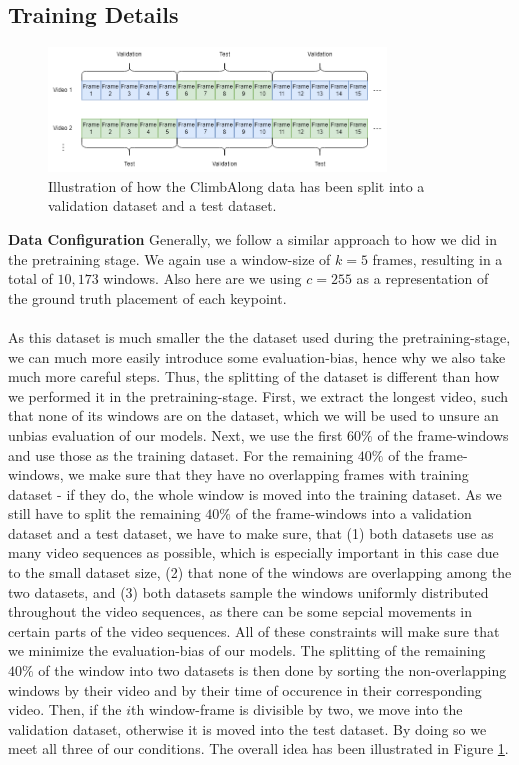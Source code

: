 \documentclass[./main.tex]{subfiles}
\begin{document}
\subsection{Training Details}
\label{sec:pretrain_details}
\begin{figure}[htbp]
    \centering
    \includegraphics[width=0.8\textwidth]{entities/CA_splitting.png}
    \caption{Illustration of how the ClimbAlong data has been split into a validation dataset and a test dataset.}
    \label{fig:CA_splitting}
\end{figure}
\noindent \textbf{Data Configuration} Generally, we follow a similar approach to how we did in the pretraining stage. We again use a window-size of $k = 5$ frames, resulting in a total of $10,173$ windows. Also here are we using $c = 255$ as a representation of the ground truth placement of each keypoint. 
\\
\\
As this dataset is much smaller the the dataset used during the pretraining-stage, we can much more easily introduce some evaluation-bias, hence why we also take much more careful steps. Thus, the splitting of the dataset is different than how we performed it in the pretraining-stage. First, we extract the longest video, such that none of its windows are on the dataset, which we will be used to unsure an unbias evaluation of our models. Next, we use the first $60\%$ of the frame-windows and use those as the training dataset. For the remaining $40\%$ of the frame-windows, we make sure that they have no overlapping frames with training dataset - if they do, the whole window is moved into the training dataset. As we still have to split the remaining $40\%$ of the frame-windows into a validation dataset and a test dataset, we have to make sure, that (1) both datasets use as many video sequences as possible, which is especially important in this case due to the small dataset size, (2) that none of the windows are overlapping among the two datasets, and (3) both datasets sample the windows uniformly distributed throughout the video sequences, as there can be some sepcial movements in certain parts of the video sequences. All of these constraints will make sure that we minimize the evaluation-bias of our models. The splitting of the remaining $40\%$ of the window into two datasets is then done by sorting the non-overlapping windows by their video and by their time of occurence in their corresponding video. Then, if the $i$th window-frame is divisible by two, we move into the validation dataset, otherwise it is moved into the test dataset. By doing so we meet all three of our conditions. The overall idea has been illustrated in Figure \ref{fig:CA_splitting}.
\end{document}
